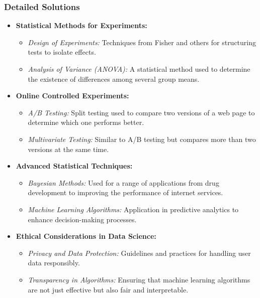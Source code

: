 \documentclass{article}
\begin{document}
\subsubsection*{Detailed Solutions}
\begin{itemize}
    \item \textbf{Statistical Methods for Experiments:}
    \begin{itemize}
        \item \textit{Design of Experiments:} Techniques from Fisher and others for structuring tests to isolate effects.
        \item \textit{Analysis of Variance (ANOVA):} A statistical method used to determine the existence of differences among several group means.
    \end{itemize}

    \item \textbf{Online Controlled Experiments:}
    \begin{itemize}
        \item \textit{A/B Testing:} Split testing used to compare two versions of a web page to determine which one performs better.
        \item \textit{Multivariate Testing:} Similar to A/B testing but compares more than two versions at the same time.
    \end{itemize}

    \item \textbf{Advanced Statistical Techniques:}
    \begin{itemize}
        \item \textit{Bayesian Methods:} Used for a range of applications from drug development to improving the performance of internet services.
        \item \textit{Machine Learning Algorithms:} Application in predictive analytics to enhance decision-making processes.
    \end{itemize}

    \item \textbf{Ethical Considerations in Data Science:}
    \begin{itemize}
        \item \textit{Privacy and Data Protection:} Guidelines and practices for handling user data responsibly.
        \item \textit{Transparency in Algorithms:} Ensuring that machine learning algorithms are not just effective but also fair and interpretable.
    \end{itemize}
\end{itemize}
\end{document}
